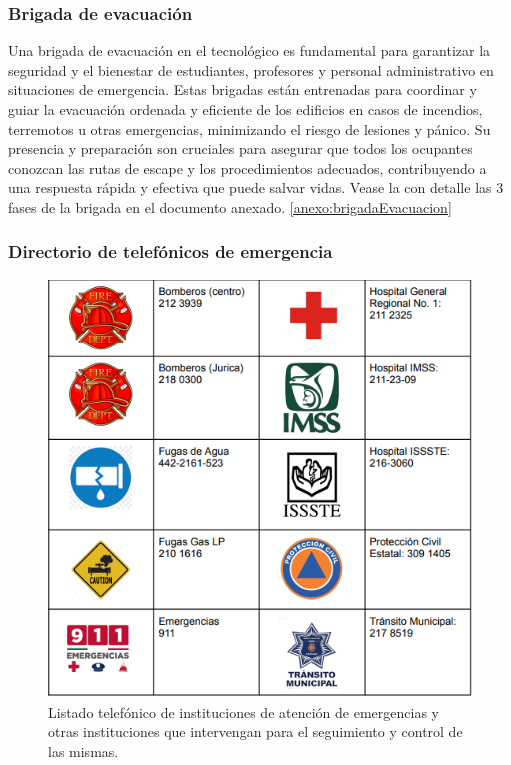     \subsubsection{Brigada de evacuación}
    
    Una brigada de evacuación en el tecnológico es fundamental para garantizar la seguridad y el bienestar de estudiantes, profesores y personal administrativo en situaciones de emergencia. Estas brigadas están entrenadas para coordinar y guiar la evacuación ordenada y eficiente de los edificios en casos de incendios, terremotos u otras emergencias, minimizando el riesgo de lesiones y pánico. Su presencia y preparación son cruciales para asegurar que todos los ocupantes conozcan las rutas de escape y los procedimientos adecuados, contribuyendo a una respuesta rápida y efectiva que puede salvar vidas. Vease la con detalle las 3 fases de la brigada en el documento anexado. \ref{anexo:brigadaEvacuacion}
    
    \subsubsection{Directorio de telefónicos de emergencia}
    
    \begin{figure}[H]
        \centering
        \includegraphics[scale=0.5]{35/Img/directorio.png}
        \caption{Listado telefónico de instituciones de atención de emergencias y otras instituciones que intervengan para el seguimiento y control de las mismas.}
    \end{figure}
    
